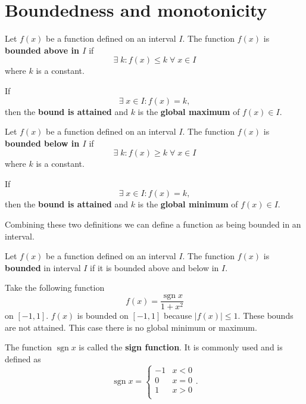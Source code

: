 
\section{Boundedness and monotonicity}

\begin{definition}
	Let $f(x)$ be a function defined on an interval $I$. The function $f(x)$ is \textbf{bounded above in $I$} if \[\exists\;k:f(x)\leq k\;\forall\;x\in I\] where $k$ is a constant.
	
	If \[\exists\;x\in I:f(x)=k,\] then the \textbf{bound is attained} and $k$ is the \textbf{global maximum} of $f(x)\in I$.
\end{definition}

\begin{definition}
	Let $f(x)$ be a function defined on an interval $I$. The function $f(x)$ is \textbf{bounded below in $I$} if \[\exists\;k:f(x)\geq k\;\forall\;x\in I\] where $k$ is a constant.
	
	If \[\exists\;x\in I:f(x)=k,\] then the \textbf{bound is attained} and $k$ is the \textbf{global minimum} of $f(x)\in I$.
\end{definition}

Combining these two definitions we can define a function as being bounded in an interval.

\begin{definition}
	Let $f(x)$ be a function defined on an interval $I$. The function $f(x)$ is \textbf{bounded} in interval $I$ if it is bounded above and below in $I$.
\end{definition}

\begin{example}
	Take the following function \[f(x)=\dfrac{\operatorname{sgn}{x}}{1+x^2}\] on $[-1,1]$. $f(x)$ is bounded on $[-1,1]$ because $|f(x)|\leq1$. These bounds are not attained. This case there is no global minimum or maximum. %
\end{example}

\begin{remark}
	The function $\operatorname{sgn}{x}$ is called the \textbf{sign function}. It is commonly used and is defined as
	\[
		\operatorname{sgn}{x}=
		\begin{cases}
			-1 & x<0 \\
			0 & x=0 \\
			1 & x>0 \\
		\end{cases}
		.
	\]
\end{remark}

